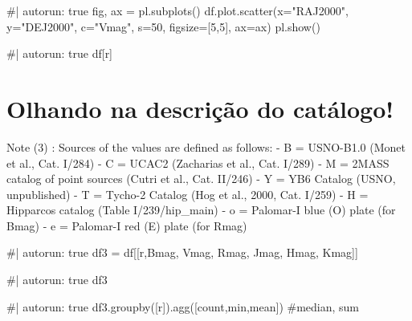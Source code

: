 \documentclass[
  letterpaper,
  DIV=11,
  numbers=noendperiod]{scrreprt}
\newenvironment{Shaded}{\begin{snugshade}}{\end{snugshade}}
\newcommand{\NormalTok}[1]{\textcolor[rgb]{0.00,0.23,0.31}{#1}}
\begin{document}
\begin{Shaded}
\begin{Highlighting}[]
\NormalTok{\#| autorun: true}
\NormalTok{fig, ax = pl.subplots()}
\NormalTok{df.plot.scatter(x="RAJ2000", y="DEJ2000", c="Vmag", s=50, figsize=[5,5], ax=ax)}
\NormalTok{pl.show()}
\end{Highlighting}
\end{Shaded}

\begin{Shaded}
\begin{Highlighting}[]
\NormalTok{\#| autorun: true}
\NormalTok{df[\textquotesingle{}r\textquotesingle{}]}
\end{Highlighting}
\end{Shaded}

\section{Olhando na descrição do
catálogo!}\label{olhando-na-descriuxe7uxe3o-do-catuxe1logo}

Note (3) : Sources of the values are defined as follows: - B = USNO-B1.0
(Monet et al., Cat. I/284) - C = UCAC2 (Zacharias et al., Cat. I/289) -
M = 2MASS catalog of point sources (Cutri et al., Cat. II/246) - Y = YB6
Catalog (USNO, unpublished) - T = Tycho-2 Catalog (Hog et al., 2000,
Cat. I/259) - H = Hipparcos catalog (Table I/239/hip\_main) - o =
Palomar-I blue (O) plate (for Bmag) - e = Palomar-I red (E) plate (for
Rmag)

\begin{Shaded}
\begin{Highlighting}[]
\NormalTok{\#| autorun: true}
\NormalTok{df3 = df[[\textquotesingle{}r\textquotesingle{},\textquotesingle{}Bmag\textquotesingle{}, \textquotesingle{}Vmag\textquotesingle{}, \textquotesingle{}Rmag\textquotesingle{}, \textquotesingle{}Jmag\textquotesingle{}, \textquotesingle{}Hmag\textquotesingle{}, \textquotesingle{}Kmag\textquotesingle{}]]}
\end{Highlighting}
\end{Shaded}

\begin{Shaded}
\begin{Highlighting}[]
\NormalTok{\#| autorun: true}
\NormalTok{df3}
\end{Highlighting}
\end{Shaded}

\begin{Shaded}
\begin{Highlighting}[]
\NormalTok{\#| autorun: true}
\NormalTok{df3.groupby([\textquotesingle{}r\textquotesingle{}]).agg([\textquotesingle{}count\textquotesingle{},\textquotesingle{}min\textquotesingle{},\textquotesingle{}mean\textquotesingle{}]) \#\textquotesingle{}median\textquotesingle{}, \textquotesingle{}sum\textquotesingle{}}
\end{Highlighting}
\end{Shaded}
\end{document}
